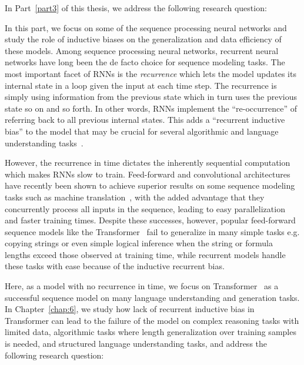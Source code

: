 In Part~\ref{part3} of this thesis, we address the following research question:

In this part, we focus on some of the sequence processing neural networks and study the role of inductive biases on the generalization and data efficiency of these models. 
Among sequence processing neural networks, recurrent neural networks have long been the de facto choice for sequence modeling tasks. The most important facet of RNNs is the \emph{recurrence} which lets the model updates its internal state in a loop given the input at each time step. The recurrence is simply using information from the previous state which in turn uses the previous state so on and so forth.  In other words, RNNs implement the ``re-occurrence'' of referring back to all previous internal states. This adds a ``recurrent inductive bias'' to the model that may be crucial for several algorithmic and language understanding tasks~\cite{tran2016recurrent,Dehghani:ICLR:2019}.

However, the recurrence in time dictates the inherently sequential computation which makes RNNs slow to train. Feed-forward and convolutional architectures have recently been shown to achieve superior results on some sequence modeling tasks such as machine translation~\citep{vaswani2017attention, NalBytenet2017}, with the added advantage that they concurrently process all inputs in the sequence, leading to easy parallelization and faster training times. Despite these successes, however, popular feed-forward sequence models like the Transformer~\citep{vaswani2017attention} fail to generalize in many simple tasks e.g. copying strings or even simple logical inference when the string or formula lengths exceed those observed at training time, while recurrent models handle these tasks with ease because of the inductive recurrent bias.

Here, as a model with no recurrence in time, we focus on Transformer~\citep{vaswani2017attention} as a successful sequence model on many language understanding and generation tasks. In Chapter~\ref{chap:6}, we study how lack of recurrent inductive bias in Transformer can lead to the failure of the model on complex reasoning tasks with limited data, algorithmic tasks where length generalization over training samples is needed, and structured language understanding tasks, and address the following research question:

